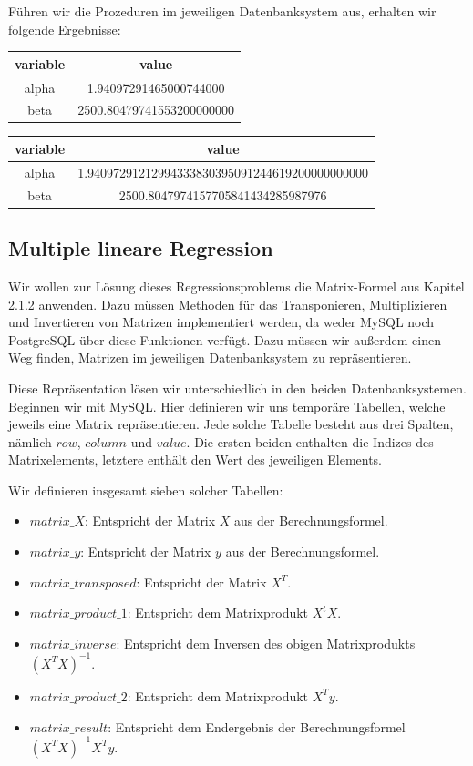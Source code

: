 Führen wir die Prozeduren im jeweiligen Datenbanksystem aus, erhalten wir folgende Ergebnisse:

\begin{center}
  \begin{tabular}{|c|c|}\hline
    \textbf{variable} & \textbf{value} \\ \hline
    alpha & 1.94097291465000744000 \\ \hline
    beta & 2500.80479741553200000000 \\ \hline
  \end{tabular}

  \begin{tabular}{|c|c|}\hline
    \textbf{variable} & \textbf{value} \\ \hline
    alpha & 1.94097291212994333830395091244619200000000000 \\ \hline
    beta & 2500.8047974157705841434285987976 \\ \hline
  \end{tabular}
\end{center}

\subsection{Multiple lineare Regression}

Wir wollen zur Lösung dieses Regressionsproblems die Matrix-Formel aus Kapitel 2.1.2 anwenden. Dazu müssen Methoden für das Transponieren, Multiplizieren und Invertieren von Matrizen implementiert werden, da weder MySQL noch PostgreSQL über diese Funktionen verfügt. Dazu müssen wir außerdem einen Weg finden, Matrizen im jeweiligen Datenbanksystem zu repräsentieren.

Diese Repräsentation lösen wir unterschiedlich in den beiden Datenbanksystemen. Beginnen wir mit MySQL. Hier definieren wir uns temporäre Tabellen, welche jeweils eine Matrix repräsentieren. Jede solche Tabelle besteht aus drei Spalten, nämlich $row$, $column$ und $value$. Die ersten beiden enthalten die Indizes des Matrixelements, letztere enthält den Wert des jeweiligen Elements.

Wir definieren insgesamt sieben solcher Tabellen:
\begin{itemize}
  \item $matrix\_X$: Entspricht der Matrix $X$ aus der Berechnungsformel.
  \item $matrix\_y$: Entspricht der Matrix $y$ aus der Berechnungsformel.
  \item $matrix\_transposed$: Entspricht der Matrix $X^T$.
  \item $matrix\_product\_1$: Entspricht dem Matrixprodukt $X^t X$.
  \item $matrix\_inverse$: Entspricht dem Inversen des obigen Matrixprodukts $(X^T X)^{-1}$.
  \item $matrix\_product\_2$: Entspricht dem Matrixprodukt $X^T y$.
  \item $matrix\_result$: Entspricht dem Endergebnis der Berechnungsformel $(X^T X)^{-1} X^T y$.
\end{itemize}

